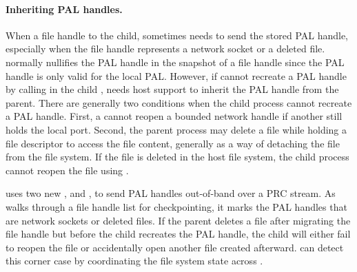 \paragraph{Inheriting PAL handles.}
When a file handle to the child, \thelibos{} sometimes needs to send the stored PAL handle, especially when the file handle
represents a network socket or a deleted file.
\thelibos{} normally nullifies the PAL handle in the snapshot of a file handle
since the PAL handle is only valid for the local PAL.
However, if \thelibos{} cannot recreate a PAL handle by calling  in the child \picoproc{}, \thelibos{} needs host support to inherit
the PAL handle from the parent.
There are generally two conditions when the child process
cannot recreate a PAL handle.
First, a \picoproc{} cannot reopen a bounded network handle
if another \picoproc{} still holds the local port.
Second, the parent process may delete a file while holding a file descriptor to access the file content, generally as a way of detaching the file from the file system.
If the file is deleted in the host file system,
the child process cannot reopen the file
using .



\thelibos{} uses two new \hostapis{},
 and , to send PAL handles out-of-band over a PRC stream.
As \thelibos{} walks through a file handle list for checkpointing, it marks the PAL handles that are network sockets or deleted files.
If the parent deletes a file after migrating the file handle but before the child recreates the PAL handle,
the child will either fail to reopen the file
or accidentally open another file created afterward.
\thelibos{} can detect this corner case by coordinating the file system state
across \picoprocs{}.




